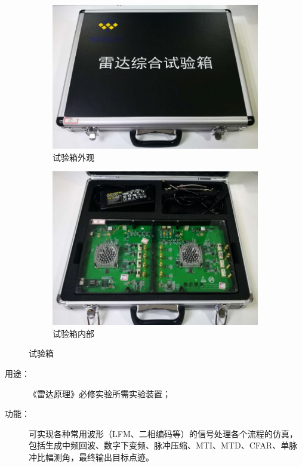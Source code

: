 \documentclass{article}
\newcounter{sub}
\begin{document}
\begin{figure}[H]
	\centering
	\begin{subfigure}[H]{.45\linewidth}
		\centering
		\includegraphics[width=\linewidth]{hardwareOuter.png}
		\caption{试验箱外观}
		\label{fig:试验箱外观}
	\end{subfigure}
	\quad
	\begin{subfigure}[H]{.45\linewidth}
		\centering
		\includegraphics[width=\linewidth]{hardwareInner.png}
		\caption{试验箱内部}
		\label{fig:试验箱内部}
	\end{subfigure}
	\caption{试验箱}
	\label{fig:试验箱}
\end{figure}

\begin{description}
	\item[用途：] 《雷达原理》必修实验所需实验装置；
	\item[功能：] 可实现各种常用波形（LFM、二相编码等）的信号处理各个流程的仿真，包括生成中频回波、数字下变频、脉冲压缩、MTI、MTD、CFAR、单脉冲比幅测角，最终输出目标点迹。
\end{description}
\end{document}
